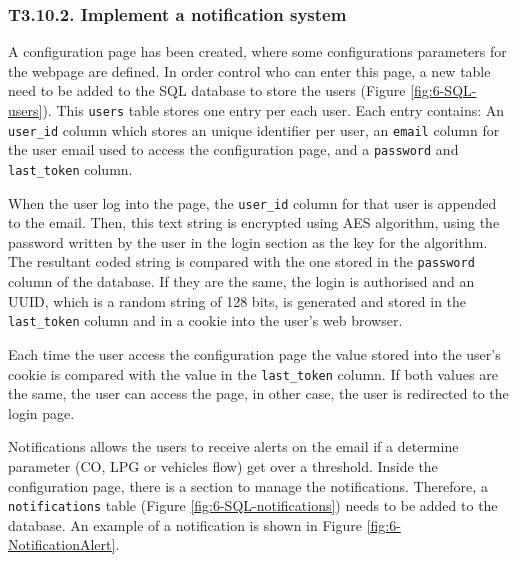 \subsubsection{T3.10.2. Implement a notification system}

A configuration page has been created, where some configurations parameters for the webpage are defined. In order control who can enter this page, a new table need to be added to the SQL database to store the users (Figure \ref{fig:6-SQL-users}). This \texttt{users} table stores one entry per each user. Each entry contains: An \texttt{user\_id} column which stores an unique identifier per user, an \texttt{email} column for the user email used to access the configuration page, and a \texttt{password} and \texttt{last\_token} column.

When the user log into the page, the \texttt{user\_id} column for that user is appended to the email. Then, this text string is encrypted using \ac{AES} algorithm, using the password written by the user in the login section as the key for the algorithm. The resultant coded string is compared with the one stored in the \texttt{password} column of the database. If they are the same, the login is authorised and an \ac{UUID}, which is a random string of 128 bits, is generated and stored in the \texttt{last\_token} column and in a cookie into the user's web browser.

Each time the user access the configuration page the value stored into the user's cookie is compared with the value in the \texttt{last\_token} column. If both values are the same, the user can access the page, in other case, the user is redirected to the login page.

Notifications allows the users to receive alerts on the email if a determine parameter (CO, LPG or vehicles flow) get over a threshold. Inside the configuration page, there is a section to manage the notifications. Therefore, a \texttt{notifications} table (Figure \ref{fig:6-SQL-notifications}) needs to be added to the database. An example of a notification is shown in Figure \ref{fig:6-NotificationAlert}.

